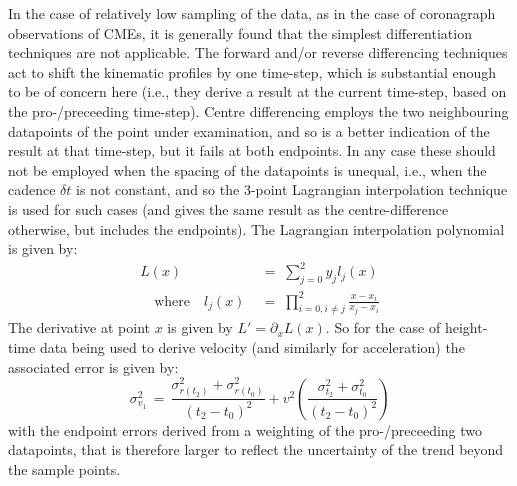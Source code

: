 \documentclass[preprint2]{aastex}
\begin{document}
In the case of relatively low sampling of the data, as in the case of coronagraph observations of CMEs, it is generally found that the simplest differentiation techniques are not applicable. The forward and/or reverse differencing techniques act to shift the kinematic profiles by one time-step, which is substantial enough to be of concern here (i.e., they derive a result at the current time-step, based on the pro-/preceeding time-step). Centre differencing employs the two neighbouring datapoints of the point under examination, and so is a better indication of the result at that time-step, but it fails at both endpoints. In any case these should not be employed when the spacing of the datapoints is unequal, i.e., when the cadence $\delta t$ is not constant, and so the 3-point Lagrangian interpolation technique is used for such cases (and gives the same result as the centre-difference otherwise, but includes the endpoints). The Lagrangian interpolation polynomial is given by:
\begin{eqnarray}
L(x) \; &=\; \sum_{j=0}^2 y_j l_j(x) \\ \quad \mbox{where} \quad
l_j(x) \; &=\; \prod_{i=0, i\neq j}^2 \frac{x-x_i}{x_j-x_i} 
\end{eqnarray}
The derivative at point $x$ is given by $L'=\partial_x L(x)$. So for the case of height-time data being used to derive velocity (and similarly for acceleration) the associated error is given by:
\begin{equation}
\sigma_{v_1}^2 \,=\, \frac{\sigma_{r(t_2)}^2+\sigma_{r(t_0)}^2}{(t_2-t_0)^2} + v^2 \left( \frac{\sigma_{t_2}^2+\sigma_{t_0}^2}{(t_2-t_0)^2} \right)
\label{vel_err}
\end{equation}
with the endpoint errors derived from a weighting of the pro-/preceeding two datapoints, that is therefore larger to reflect the uncertainty of the trend beyond the sample points.
\end{document}
